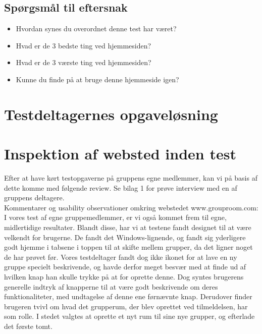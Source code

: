 \documentclass[12pt]{article}
\begin{document}
\subsection{Spørgsmål til eftersnak}
\begin{itemize}
  \item Hvordan synes du overordnet denne test har været?
  \item Hvad er de 3 bedste ting ved hjemmesiden?
  \item Hvad er de 3 værste ting ved hjemmesiden?
  \item Kunne du finde på at bruge denne hjemmeside igen?
\end{itemize}
\section{Testdeltagernes opgaveløsning}





\section{Inspektion af websted inden test}
Efter at have kørt testopgaverne på gruppens egne medlemmer, kan vi på basis af dette komme med følgende review. Se bilag 1 for prøve interview med en af gruppens deltagere.\\

\noindent Kommentarer og usability observationer omkring webstedet www.grouproom.com:\\

\noindent I vores test af egne gruppemedlemmer, er vi også kommet frem til egne, midlertidige resultater. Blandt disse, har vi at testene fandt designet til at være velkendt for brugerne. De fandt det Windows-lignende, og fandt sig yderligere godt hjemme i tabsene i toppen til at skifte mellem grupper, da det ligner noget de har prøvet før. Vores testdeltager fandt dog ikke ikonet for at lave en ny gruppe specielt beskrivende, og havde derfor meget besvær med at finde ud af hvilken knap han skulle trykke på at for oprette denne. Dog syntes brugerens generelle indtryk af knapperne til at være godt beskrivende om deres funktionaliteter, med undtagelse af denne ene førnævnte knap. Derudover finder brugeren tvivl om hvad det grupperum, der blev oprettet ved tilmeldelsen, har som rolle. I stedet valgtes at oprette et nyt rum til sine nye grupper, og efterlade det første tomt.\\
\end{document}
